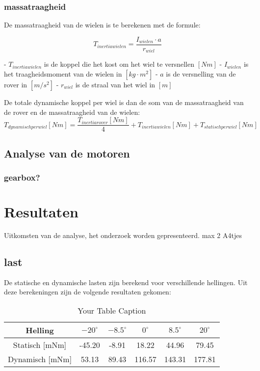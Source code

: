 \documentclass{article}
\begin{document}
        \subsubsection*{massatraagheid}

        De massatraagheid van de wielen is te berekenen met de formule:

        $$T_{inertiawielen} = \frac{I_{wielen} \cdot a}{r_{wiel}}$$
        
        - $T_{inertiawielen}$ is de koppel die het kost om het wiel te versnellen $[Nm]$ \newline
        - $I_{wielen}$ is het traagheidsmoment van de wielen in $[kg \cdot m^2]$ \newline
        - $a$ is de versnelling van de rover in $[m/s^2]$ \newline
        - $r_{wiel}$ is de straal van het wiel in $[m]$ \newline \newline

        De totale dynamische koppel per wiel is dan de som van de massatraagheid van de rover en de massatraagheid van de wielen:
        $$T_{dynamisch per wiel}[Nm] = \frac{T_{inertiarover}[Nm]}{4} + T_{inertiawielen}[Nm] + T_{statischperwiel}[Nm]$$ 


\subsection{Analyse van de motoren}
\subsubsection{gearbox?}

\section{Resultaten}
    Uitkomsten van de analyse, het onderzoek worden gepresenteerd. max 2 A4tjes


    \subsection{last}
    De statische en dynamische lasten zijn berekend voor verschillende hellingen. Uit deze berekeningen zijn de volgende resultaten gekomen: 

        \begin{table}[h]
            \centering
            \begin{tabular}{|c|c|c|c|c|c|}
            \hline
            Helling & $-20 ^\circ$ & $-8.5 ^\circ$ & $0 ^\circ$ & $8.5 ^\circ$ & $20 ^\circ$ \\ \hline
            Statisch [mNm]  & -45.20   & -8.91   & 18.22   & 44.96  & 79.45   \\ \hline
            Dynamisch [mNm]  & 53.13  & 89.43   & 116.57  & 143.31  & 177.81  \\ \hline
            \end{tabular}
            \caption{Your Table Caption}
            \label{tab:your_table_label}
        \end{table}
        
\end{document}
